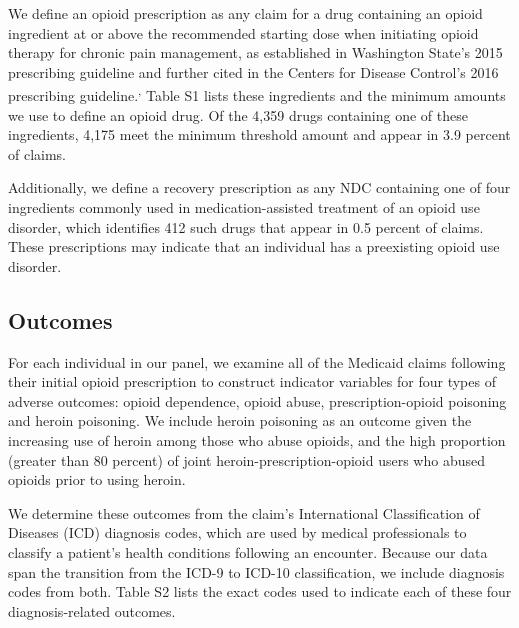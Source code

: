 \documentclass[10pt, letter]{article}
\begin{document}
We define an opioid prescription as any claim for a drug containing an opioid ingredient at or above the recommended starting dose when initiating opioid therapy for chronic pain management, as established in Washington State's 2015 prescribing guideline and further cited in the Centers for Disease Control's 2016 prescribing guideline.\textsuperscript{,} Table S1 lists these ingredients and the minimum amounts we use to define an opioid drug. Of the 4,359 drugs containing one of these ingredients, 4,175 meet the minimum threshold amount and appear in 3.9 percent of claims.

Additionally, we define a recovery prescription as any NDC containing one of four ingredients commonly used in medication-assisted treatment of an opioid use disorder, which identifies 412 such drugs that appear in 0.5 percent of claims. These prescriptions may indicate that an individual has a preexisting opioid use disorder.

\subsection{Outcomes}

For each individual in our panel, we examine all of the Medicaid claims following their initial opioid prescription to construct indicator variables for four types of adverse outcomes: opioid dependence, opioid abuse, prescription-opioid poisoning and heroin poisoning. We include heroin poisoning as an outcome given the increasing use of heroin among those who abuse opioids, and the high proportion (greater than 80 percent) of joint heroin-prescription-opioid users who abused opioids prior to using heroin.

We determine these outcomes from the claim's International Classification of Diseases (ICD) diagnosis codes, which are used by medical professionals to classify a patient's health conditions following an encounter. Because our data span the transition from the ICD-9 to ICD-10 classification, we include diagnosis codes from both. Table S2 lists the exact codes used to indicate each of these four diagnosis-related outcomes. 
\end{document}
